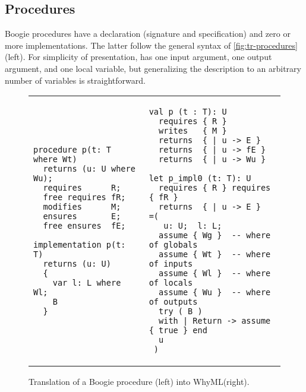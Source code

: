 \documentclass[a4paper,final]{llncs}
\newif\iflong
\newcommand{\Boogie}{Boogie\xspace}
\newcommand{\WhyML}{WhyML\xspace}
\newcommand{\feature}[1]{\subsection{#1}}
\begin{document}
\feature{Procedures}

\Boogie procedures have a declaration (signature and specification) and zero or more implementations.
The latter follow the general syntax of \autoref{fig:tr-procedures} (left)\iflong, where a procedure \B{p} with input argument \B{t} and output argument \B{u} has one implementation with local variable \B{l} and body \B{B}\fi.
For simplicity of presentation,  has one input argument, one output argument, and one local variable, but generalizing the description to an arbitrary number of variables is straightforward.

\begin{figure}[!htb]
\lstset{xleftmargin=5mm}
\scriptsize
\begin{tabular}{p{} p{}}
{\begin{lstlisting}[language=boogie]
procedure p(t: T where Wt) 
  returns (u: U where Wu);
  requires      R;
  free requires fR;
  modifies      M;
  ensures       E;
  free ensures  fE;

implementation p(t: T) 
  returns (u: U) 
  { 
    var l: L where Wl; 
    B 
  }\end{lstlisting}} 
&
\iflong
{\begin{lstlisting}[language=Why3]
val p (t : T): U
  requires { R }
  writes   { M }
  returns  { | u -> E }
  returns  { | u -> fE }
  returns  { | u -> Wu }

let p_impl0 (t: T): U
  requires { R } requires { fR }
  returns  { | u -> E }
=(
   u: U;  l: L;
  assume { Wg }  -- where of globals
  assume { Wt }  -- where of inputs
  assume { Wl }  -- where of locals
  assume { Wu }  -- where of outputs
  try ( B )
  with | Return -> assume { true } end
  u
 )

let p_impl0_frame (t: T): U
  requires { R } requires { fR }
  writes { M }
  reads {  } -- all globals
  returns  { | u -> true }
=( ... -- as in 
    :=  M
   assume { yes() }
   u )\end{lstlisting}}
\else{\begin{lstlisting}[language=Why3]
val p (t : T): U
  requires { R }
  writes   { M }
  returns  { | u -> E }
  returns  { | u -> fE }
  returns  { | u -> Wu }

let p_impl0 (t: T): U
  requires { R } requires { fR }
  returns  { | u -> E }
=(
   u: U;  l: L;
  assume { Wg }  -- where of globals
  assume { Wt }  -- where of inputs
  assume { Wl }  -- where of locals
  assume { Wu }  -- where of outputs
  try ( B )
  with | Return -> assume { true } end
  u
 )\end{lstlisting}}
\fi
\end{tabular}
\caption{Translation of a \Boogie procedure (left) into \WhyML (right).}
\label{fig:tr-procedures}
\end{figure}
\end{document}
